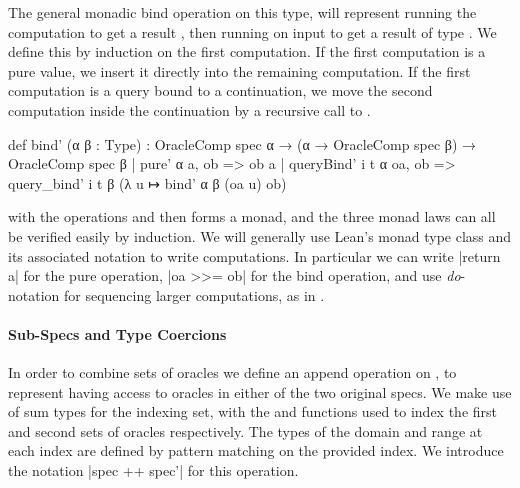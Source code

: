 The general monadic bind operation on this type,  will represent running the computation  to get a result , then running  on input  to get a result of type .
We define this by induction on the first computation.
If the first computation  is a pure value, we insert it directly into the remaining computation.
If the first computation is a query bound to a continuation, we move the second computation inside the continuation by a recursive call to .
\begin{leancode}
  def bind' (α β : Type) : OracleComp spec α →
      (α → OracleComp spec β) → OracleComp spec β
    | pure' α a, ob => ob a
    | queryBind' i t α oa, ob =>
        query_bind' i t β (λ u ↦ bind' α β (oa u) ob)
\end{leancode}
 with the operations  and  then forms a monad, and the three monad laws can all be verified easily by induction.
We will generally use Lean's monad type class and its associated notation to write computations.
In particular we can write \lean|return a| for the pure operation, \lean|oa >>= ob| for the bind operation, and use \textit{do}-notation for sequencing larger computations, as in   .

\paragraph{Sub-Specs and Type Coercions}
In order to combine sets of oracles we define an append operation on , to represent having access to oracles in either of the two original specs. We make use of sum types for the indexing set, with the  and  functions used to index the first and second sets of oracles respectively.
The types of the domain and range at each index are defined by pattern matching on the provided index.
We introduce the notation \lean|spec ++ spec'| for this operation.

